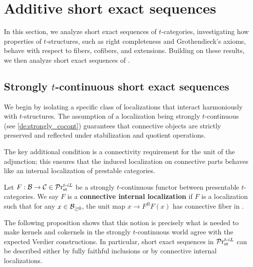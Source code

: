 \documentclass[a4paper,10pt, oneside]{amsart}
\begin{document}
	\section{Additive short exact sequences}\label{section3}
	In this section, we analyze short exact sequences of $t$-categories, investigating how properties of 
	$t$-structures, such as right completeness and Grothendieck's axioms, behave with respect to fibers, cofibers, and extensions. Building on these results, we then analyze short exact sequences of \dualaddinfcats.

	
	\subsection{Strongly $t$-continuous short exact sequences}
	We begin by isolating a specific class of localizations that interact harmoniously with $t$-structures. The 
	assumption of a localization being strongly $t$-continuous (see \cref{de:strongly_cocont}) 
	guarantees that connective objects are strictly preserved and reflected under stabilization and quotient operations. 
	
	The key additional condition is a connectivity requirement for the unit of the adjunction; this ensures that the induced localization on connective parts behaves like an internal localization of prestable categories.
	\begin{de}
	Let $F:\mathcal{B}\to\mathcal{C} \in\mathcal{P}\mathrm{r}^{t\text{-}iL}_{\mathrm{st}}$ be a strongly $t$-continuous functor between presentable $t$-categories. We say $F$ is a \textbf{connective internal localization} if $F$ is a localization such that for any 
	$x\in \mathcal{B}_{\geq 0}$, the unit map $x\to F^RF(x)$ has connective fiber in \mcb.
	\end{de}
	The following proposition shows that this notion is precisely what is needed to make kernels and cokernels in the strongly $t$-continuous world agree with the expected Verdier constructions. In particular, short exact sequences in $\mathcal{P}\mathrm{r}^{t\text{-}iL}_{\mathrm{st}}$ can be described either by fully faithful inclusions or by connective internal localizations.
	
\end{document}
